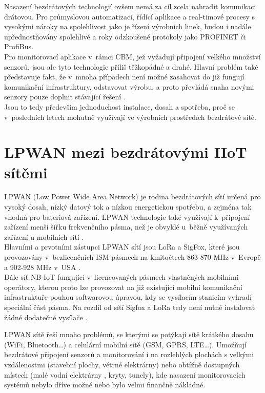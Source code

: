     Nasazení bezdrátových technologií ovšem nemá za cíl zcela nahradit komunikaci drátovou. Pro průmyslovou automatizaci, řídící aplikace a real-timové procesy s vysokými nároky na spolehlivost jako je řízení výrobních linek, budou i nadále upřednostňovány spolehlivé a roky odzkoušené protokoly jako PROFINET či ProfiBus.\\
    Pro monitorovací aplikace v~rámci CBM, jež vyžadují připojení velkého množství senzorů, jsou ale tyto technologie příliš těžkopádné a drahé. Hlavní problém také představuje fakt, že v~mnoha případech není možné zasahovat do již fungují komunikační infrastruktury, odstavovat výrobu, a proto převládá snaha novými senzory pouze doplnit stávající řešení \cite{website:3}.\\
    Jsou to tedy především jednoduchost instalace, dosah a spotřeba, proč se v~posledních letech mohutně využívají ve výrobních prostředích bezdrátové sítě. 

\section{LPWAN mezi bezdrátovými IIoT sítěmi}
\label{section:lpwan}
    LPWAN (Low Power Wide Area Network) je rodina bezdrátových sítí určená pro vysoký dosah, nízký datový tok a nízkou energetickou spotřebu, a zejména tak vhodná pro bateriová zařízení. LPWAN technologie také využívají k~připojení zařízení menší šířku frekvenčního pásma, než je obvyklé u~běžně využívaných zařízení u mobilních sítí \cite{website:3}.\\
    Hlavními a prvotními zástupci LPWAN sítí jsou LoRa a SigFox, které jsou provozovány v~bezlicenčních ISM pásmech na kmitočtech 863-870 MHz v~Evropě a 902-928 MHz v~USA \cite{website:5}.\\
    Dále síť NB-IoT fungující v~licencovaných pásmech vlastněných mobilními operátory, kterou proto lze provozovat na již existující mobilní komunikační infrastruktuře pouhou softwarovou úpravou, kdy se vysílacím stanicím vyhradí speciální část pásma. Na rozdíl od sítí Sigfox a LoRa tedy není nutné instalovat žádné dodatečné vysílače \cite{website:4}.
    
    
    LPWAN sítě řeší mnoho problémů, se kterými se potýkají sítě krátkého dosahu (WiFi, Bluetooth\ldots) a celulární mobilní sítě (GSM, GPRS, LTE\ldots). Umožňují bezdrátové připojení senzorů a monitorování i na rozlehlých plochách s velkými vzdálenostmi (stavební plochy, větrné elektrárny) nebo obtížně dostupných místech (malé vodní elektrárny \cite{website:2}, kryty, tunely), kde nasazení monitorovacích systémů nebylo dříve možné nebo bylo velmi finančně nákladné.
    
